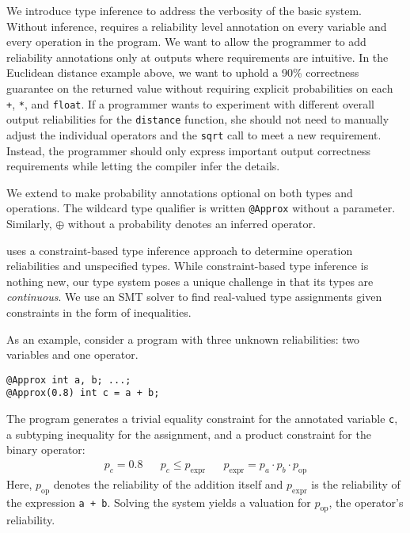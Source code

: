 \documentclass[10pt,nocopyrightspace,preprint]{sigplanconf}
\newcommand{\code}{\lstinline[emphstyle={},keywordstyle={}]}
\begin{document}
We introduce type inference to address the verbosity of the basic system.
Without inference, \lang requires a reliability level annotation on every
variable and every operation in the program.
We want to allow the programmer to add reliability annotations only at
outputs where requirements are intuitive.
In the Euclidean distance example above, we want to uphold a 90\% correctness
guarantee on the returned value without requiring explicit probabilities on
each \code{+}, \code{*}, and \code{float}.
If a programmer wants to experiment with different overall output reliabilities
for the \code{distance} function, she should not need to manually adjust the
individual operators and the \code{sqrt} call to meet a new requirement.
Instead, the programmer should only express important output correctness
requirements while letting the compiler infer the details.

We extend \lang to make probability annotations optional on both types and
operations.
The wildcard type qualifier is written \code{@Approx} without a
parameter.
Similarly, $\oplus$ without a probability denotes an inferred operator.


\lang uses a constraint-based type inference approach to determine operation
reliabilities and unspecified types.
While constraint-based type inference is nothing new, our type system poses a
unique challenge in that its types are \emph{continuous}.
We use an SMT solver to find real-valued type assignments given
constraints in the form of inequalities.

As an example, consider a program with three unknown reliabilities: two
variables and one operator.
%
\begin{lstlisting}
@Approx int a, b; ...;
@Approx(0.8) int c = a + b;
\end{lstlisting}
%
The program generates a trivial equality constraint for the annotated variable
\code{c},
a subtyping inequality for the assignment,
and a product constraint for the binary operator:
\begin{align*}
    p_c = 0.8 &&
    p_c \le p_\text{expr} &&
    p_\text{expr} = p_a \cdot p_b \cdot p_\text{op}
\end{align*}
%
Here, $p_\text{op}$ denotes the reliability of the addition itself and
$p_\text{expr}$ is the reliability of the expression \code{a + b}.
Solving the system yields a valuation for $p_\text{op}$, the operator's reliability.
\end{document}
